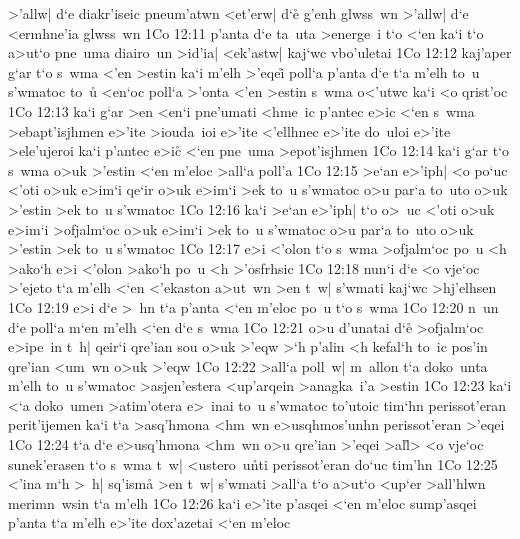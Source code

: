 >'allw|
d`e
diakr'iseic
pneum'atwn
<et'erw|
d`e\r{}
g'enh
glwss~wn
>'allw|
d`e
<ermhne'ia
glwss~wn\bibvsend
\vs 1Co 12:11
p'anta
d`e
ta~uta
>energe~i
t`o
<`en
ka`i
t`o
a>ut`o
pne~uma
diairo~un
>id'ia|
<ek'astw|
kaj`wc
vbo'uletai\bibvsend
\vs 1Co 12:12
kaj'aper
g`ar
t`o
s~wma
<'en
>estin
ka`i
m'elh
>'eqei\r{}
poll`a
p'anta
d`e
t`a
m'elh
to~u
s'wmatoc
to~u\r{}
<en`oc
poll`a
>'onta
<'en
>estin
s~wma
o<'utwc
ka`i
<o
qrist'oc\bibvsend
\vs 1Co 12:13
ka`i
g`ar
>en
<en`i
pne'umati
<hme~ic
p'antec
e>ic
<`en
s~wma
>ebapt'isjhmen
e>'ite
>iouda~ioi
e>'ite
<'ellhnec
e>'ite
do~uloi
e>'ite
>ele'ujeroi
ka`i
p'antec
e>i\r{c}
<`en
pne~uma
>epot'isjhmen\bibvsend
\vs 1Co 12:14
ka`i
g`ar
t`o
s~wma
o>uk
>'estin
<`en
m'eloc
>all`a
poll'a\bibvsend
\vs 1Co 12:15
>e`an
e>'iph|
<o
po`uc
<'oti
o>uk
e>im`i
qe`ir
o>uk
e>im`i
>ek
to~u
s'wmatoc
o>u
par`a
to~uto
o>uk
>'estin
>ek
to~u
s'wmatoc\bibvsend
\vs 1Co 12:16
ka`i
>e`an
e>'iph|
t`o
o>~uc
<'oti
o>uk
e>im`i
>ofjalm`oc
o>uk
e>im`i
>ek
to~u
s'wmatoc
o>u
par`a
to~uto
o>uk
>'estin
>ek
to~u
s'wmatoc\bibvsend
\vs 1Co 12:17
e>i
<'olon
t`o
s~wma
>ofjalm`oc
po~u
<h
>ako`h
e>i
<'olon
>ako`h
po~u
<h
>'osfrhsic\bibvsend
\vs 1Co 12:18
nun`i
d`e
<o
vje`oc
>'ejeto
t`a
m'elh
<`en
<'ekaston
a>ut~wn
>en
t~w|
s'wmati
kaj`wc
>hj'elhsen\bibvsend
\vs 1Co 12:19
e>i
d`e
>~hn
t`a
p'anta
<`en
m'eloc
po~u
t`o
s~wma\bibvsend
\vs 1Co 12:20
n~un
d`e
poll`a
m`en
m'elh
<`en
d`e
s~wma\bibvsend
\vs 1Co 12:21
o>u
d'unatai
d`e\r{}
>ofjalm`oc
e>ipe~in
t~h|
qeir`i
qre'ian
sou
o>uk
>'eqw
>`h
p'alin
<h
kefal`h
to~ic
pos'in
qre'ian
<um~wn
o>uk
>'eqw\bibvsend
\vs 1Co 12:22
>all`a
poll~w|
m~allon
t`a
doko~unta
m'elh
to~u
s'wmatoc
>asjen'estera
<up'arqein
>anagka~i'a
>estin\bibvsend
\vs 1Co 12:23
ka`i
<`a
doko~umen
>atim'otera
e>~inai
to~u
s'wmatoc
to'utoic
tim`hn
perissot'eran
perit'ijemen
ka`i
t`a
>asq'hmona
<hm~wn
e>usqhmos'unhn
perissot'eran
>'eqei\bibvsend
\vs 1Co 12:24
t`a
d`e
e>usq'hmona
<hm~wn
o>u
qre'ian
>'eqei
>al\r{l}>
<o
vje`oc
sunek'erasen
t`o
s~wma
t~w|
<ustero~u\r{n}ti
perissot'eran
do`uc
tim'hn\bibvsend
\vs 1Co 12:25
<'ina
m`h
>~h|
sq'ism\r{a}
>en
t~w|
s'wmati
>all`a
t`o
a>ut`o
<up`er
>all'hlwn
merimn~wsin
t`a
m'elh\bibvsend
\vs 1Co 12:26
ka`i
e>'ite
p'asqei
<`en
m'eloc
sump'asqei
p'anta
t`a
m'elh
e>'ite
dox'azetai
<`en
m'eloc
